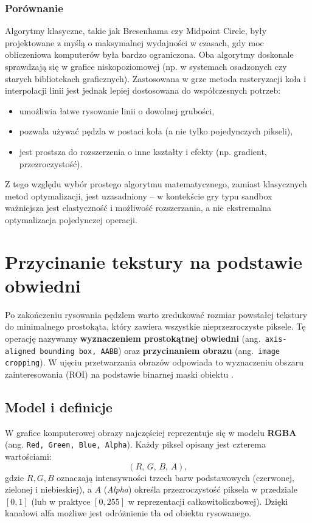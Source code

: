 \documentclass[a4paper,12pt]{book} %
\begin{document}
\subsubsection*{Porównanie}
Algorytmy klasyczne, takie jak Bresenhama czy Midpoint Circle, były projektowane z myślą o maksymalnej wydajności w czasach, gdy moc obliczeniowa komputerów była bardzo ograniczona. 
Oba algorytmy doskonale sprawdzają się w grafice niskopoziomowej (np. w systemach osadzonych czy starych bibliotekach graficznych). 
Zastosowana w grze metoda rasteryzacji koła i interpolacji linii jest jednak lepiej dostosowana do współczesnych potrzeb:
\begin{itemize}
    \item umożliwia łatwe rysowanie linii o dowolnej grubości,
    \item pozwala używać pędzla w postaci koła (a nie tylko pojedynczych pikseli),
    \item jest prostsza do rozszerzenia o inne kształty i efekty (np. gradient, przezroczystość).
\end{itemize}

Z tego względu wybór prostego algorytmu matematycznego, zamiast klasycznych metod optymalizacji, jest uzasadniony – w kontekście gry typu sandbox 
ważniejsza jest elastyczność i możliwość rozszerzania, a nie ekstremalna optymalizacja pojedynczej operacji.

\section{Przycinanie tekstury na podstawie obwiedni}

Po zakończeniu rysowania pędzlem warto zredukować rozmiar powstałej tekstury do minimalnego prostokąta, który zawiera wszystkie nieprzezroczyste piksele. Tę operację nazywamy \textbf{wyznaczeniem prostokątnej obwiedni} (ang.\ \texttt{axis-aligned bounding box, AABB}) oraz \textbf{przycinaniem obrazu} (ang.\ \texttt{image cropping}). W ujęciu przetwarzania obrazów odpowiada to wyznaczeniu obszaru zainteresowania (ROI) na podstawie binarnej maski obiektu \cite{Morfologia_1, Graphics}.

\subsection{Model i definicje}

W grafice komputerowej obrazy najczęściej reprezentuje się w modelu \textbf{RGBA} (ang. \texttt{Red, Green, Blue, Alpha}). 
Każdy piksel opisany jest czterema wartościami:
\[
(R,\,G,\,B,\,A),
\]
gdzie \(R,G,B\) oznaczają intensywności trzech barw podstawowych (czerwonej, zielonej i niebieskiej), 
a \(A\) (\emph{Alpha}) określa przezroczystość piksela w przedziale \([0,1]\) (lub w praktyce \([0,255]\) w reprezentacji całkowitoliczbowej). 
Dzięki kanałowi alfa możliwe jest odróżnienie tła od obiektu rysowanego.
\end{document}
